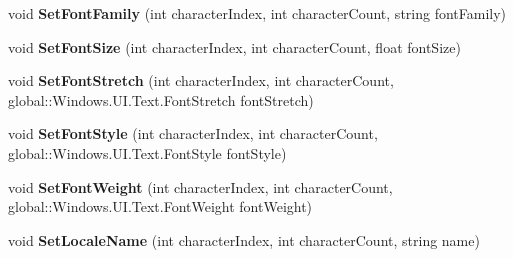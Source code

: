 \begin{DoxyCompactItemize}
\item 
\mbox{\label{class_microsoft_1_1_graphics_1_1_canvas_1_1_text_1_1_canvas_text_layout_ad4c9f30ce630b285c5de4328a5697eef}} 
void {\bfseries Set\+Font\+Family} (int character\+Index, int character\+Count, string font\+Family)
\item 
\mbox{\label{class_microsoft_1_1_graphics_1_1_canvas_1_1_text_1_1_canvas_text_layout_a2bd8d5f600cfc5fd4da25693e6735264}} 
void {\bfseries Set\+Font\+Size} (int character\+Index, int character\+Count, float font\+Size)
\item 
\mbox{\label{class_microsoft_1_1_graphics_1_1_canvas_1_1_text_1_1_canvas_text_layout_ad50a824a4bfd07dcc357647441ef7b28}} 
void {\bfseries Set\+Font\+Stretch} (int character\+Index, int character\+Count, global\+::\+Windows.\+U\+I.\+Text.\+Font\+Stretch font\+Stretch)
\item 
\mbox{\label{class_microsoft_1_1_graphics_1_1_canvas_1_1_text_1_1_canvas_text_layout_aa0cb0934c99cab9f6563ad3c1652fe2d}} 
void {\bfseries Set\+Font\+Style} (int character\+Index, int character\+Count, global\+::\+Windows.\+U\+I.\+Text.\+Font\+Style font\+Style)
\item 
\mbox{\label{class_microsoft_1_1_graphics_1_1_canvas_1_1_text_1_1_canvas_text_layout_a6afdb440ee71967887652cfeb495a190}} 
void {\bfseries Set\+Font\+Weight} (int character\+Index, int character\+Count, global\+::\+Windows.\+U\+I.\+Text.\+Font\+Weight font\+Weight)
\item 
\mbox{\label{class_microsoft_1_1_graphics_1_1_canvas_1_1_text_1_1_canvas_text_layout_afb6740be2f241b804cd331371d94e024}} 
void {\bfseries Set\+Locale\+Name} (int character\+Index, int character\+Count, string name)
\item 
\mbox{\label{class_microsoft_1_1_graphics_1_1_canvas_1_1_text_1_1_canvas_text_layout_adb3d9f62cfff14e9deb741c9b961e3a0}} 

\end{DoxyCompactItemize}
